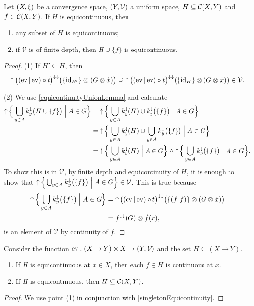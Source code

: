 \begin{lemma}
Let $\sSet{X,\xi}$ be a convergence space, $\sSet{Y, \mathcal{V}}$ a uniform space, $H \subseteq \operatorname{\mathcal{C}}(X, Y)$ and $f\in \operatorname{\mathcal{C}}(X, Y)$. If $H$ is equicontinuous, then
\begin{enumerate}
\item any subset of $H$ is equicontinuous;
\item if $\mathcal{V}$ is of finite depth, then $H\cup\{f\}$ is equicontinuous.
\end{enumerate}
\end{lemma}
\begin{proof}
(1) If $H'\subseteq H$, then
\[ \operatorname{\uparrow}\big((\operatorname{ev}|\operatorname{ev})\circ t\big)^{\downarrow\downarrow}\big(\{\operatorname{id}_{H'}\}\otimes(G\otimes \dot{x})\big) \supseteq \operatorname{\uparrow}\big((\operatorname{ev}|\operatorname{ev})\circ t\big)^{\downarrow\downarrow}\big(\{\operatorname{id}_{H}\}\otimes(G\otimes \dot{x})\big) \in \mathcal{V}. \]

(2) We use \ref{equicontinuityUnionLemma} and calculate
\begin{align*}
\upset \setbuilder[\Big]{\bigcup_{y\in A}k_y^\imf\big(H\cup \{f\}\big)}{A\in G} &= \upset \setbuilder[\Big]{\bigcup_{y\in A}k_y^\imf(H)\cup k_y^\imf\big(\{f\}\big)}{A\in G} \\
&= \upset \setbuilder[\Big]{\bigcup_{y\in A}k_y^\imf(H)\cup \bigcup_{y\in A}k_y^\imf\big(\{f\}\big)}{A\in G} \\
&= \upset \setbuilder[\Big]{\bigcup_{y\in A}k_y^\imf(H)}{A\in G} \wedge \upset \setbuilder[\Big]{\bigcup_{y\in A}k_y^\imf\big(\{f\}\big)}{A\in G}.
\end{align*}
To show this is in $\mathcal{V}$, by finite depth and equicontinuity of $H$, it is enough to show that $\upset \setbuilder[\Big]{\bigcup_{y\in A}k_y^\imf\big(\{f\}\big)}{A\in G}\in \mathcal{V}$. This is true because
\begin{align*}
\upset \setbuilder[\Big]{\bigcup_{y\in A}k_y^\imf\big(\{f\}\big)}{A\in G} &= \upset\big((\evalMap|\evalMap)\circ t\big)^{\imf\imf}\big(\{(f,f)\}\otimes(G\otimes \pfilter{x})\big) \\
&= f^{\imf\imf}(G) \otimes \pfilter{f}(x),
\end{align*}
is an element of $\mathcal{V}$ by continuity of $f$.
\end{proof}
\begin{corollary} \label{equicontinuousSetsConsistOfContinuousFunctions}
Consider the function $\evalMap: (X\to Y)\times X \to \sSet{Y,\mathcal{V}}$ and the set $H\subseteq (X\to Y)$. 
\begin{enumerate}
\item If $H$ is equicontinuous at $x\in X$, then each $f\in H$ is continuous at $x$.
\item If $H$ is equicontinuous, then $H\subseteq \operatorname{\mathcal{C}}(X,Y)$.
\end{enumerate}
\end{corollary}
\begin{proof}
We use point (1) in conjunction with \ref{singletonEquicontinuity}.
\end{proof}

